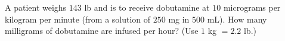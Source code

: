 A patient weighs $143$ lb and is to receive dobutamine at $10$ micrograms per kilogram per minute (from a solution of $250$ mg in $500$ mL). How many milligrams of dobutamine are infused per hour? (Use $1$ kg $=2.2$ lb.)
